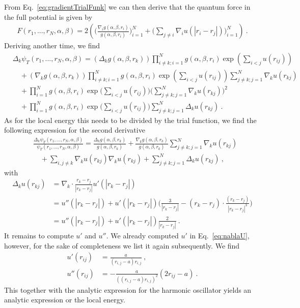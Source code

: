 \documentclass[11pt,a4paper]{article}
\numberwithin{equation}{section}
\begin{document}
From Eq.~\eqref{eq:gradientTrialFunk} we can then derive that the quantum force in the full potential is given by
\begin{align*}
F(r_1,...,r_N,\alpha,\beta)
=
2\left(
\Bigg(\frac{\nabla_i g(\alpha,\beta,{r}_i)}{g(\alpha,\beta,{r}_i)}\Bigg)_{i=1}^N
+
\Bigg(\sum_{j\neq i}\nabla_i u(|r_i-r_j|) \Bigg)_{i=1}^N
\right)~.
\end{align*}
Deriving another time, we find
\begin{equation}
\label{eq:LaplaceTrialFunk}
\begin{aligned}
&\Delta_k\psi_T(r_1,...,r_N,\alpha,\beta)
=
\left(\Delta_kg(\alpha,\beta,{r}_k)\right)\prod_{i\neq k;i=1}^N g(\alpha,\beta,{r}_i)\exp{\left(\sum_{i<j}u(r_{ij})\right)}\\
&\quad +
\left(\nabla_kg(\alpha,\beta,{r}_k)\right)\prod_{i\neq k;i=1}^N g(\alpha,\beta,{r}_i)\exp\left(\sum_{i<j}u(r_{ij})\right)\sum_{j\neq k;j=1}^N\nabla_k u(r_{kj})\\
&\quad +
\prod_{i=1}^N g(\alpha,\beta,{r}_i)\exp{\Bigg(\sum_{i<j}u(r_{ij})\Bigg)}\Bigg(\sum_{j\neq k;j=1}^N\nabla_k u(r_{kj})\Bigg)^2\\
&\quad +
\prod_{i=1}^N g(\alpha,\beta,{r}_i)\exp{\Bigg(\sum_{i<j}u(r_{ij})\Bigg)}\sum_{j\neq k;j=1}^N\Delta_k u(r_{kj})~.
\end{aligned}
\end{equation}
As for the local energy this needs to be divided by the trial function, we find the following expression for the second derivative
\begin{equation}
\label{eq:LaplaceTrialFunkQuot}
\begin{aligned}
&\frac{\Delta_k\psi_T(r_1,...,r_N,\alpha,\beta)}{\psi_T(r_1,...,r_N,\alpha,\beta)}
=
\frac{\Delta_kg(\alpha,\beta,{r}_k)}{g(\alpha,\beta,{r}_k)}
+
\frac{\nabla_kg(\alpha,\beta,{r}_k)}{g(\alpha,\beta,{r}_k)}\sum_{j\neq k;j=1}^N\nabla_k u(r_{kj})\\
&\quad +
\sum_{i,j\neq k}\nabla_k u(r_{kj})\nabla_k u(r_{kj})
+
\sum_{j\neq k;j=1}^N\Delta_k u(r_{kj})~,
\end{aligned}
\end{equation}
with 
\begin{align*}
\Delta_ku(r_{kj})
&=
\nabla_k\cdot \frac{r_k-r_j}{|r_k-r_j|}u'(|r_k-r_j|)\\
&=
u''(|r_k-r_j|)
+
u'(|r_k-r_j|)\Bigg(
\frac{3}{|r_k-r_j|}
-(r_k-r_j)\cdot\frac{(r_k-r_j)}{|r_k-r_j|^3}
\Bigg)\\
&=
u''(|r_k-r_j|)
+
u'(|r_k-r_j|)
\frac{2}{|r_k-r_j|}~.
\end{align*}
It remains to compute $u'$ and $u''$.
%
We already computed $u'$ in Eq.~\eqref{eq:nablaU}, however, for the sake of completeness we list it again subsequently.
%
We find
\begin{align*}
u'(r_{ij})&=\frac{a}{(r_{i,j}-a)r_{i,j}}~,\\
u''(r_{ij})&=-\frac{a}{((r_{i,j}-a)r_{i,j})^2}(2r_{ij}-a)~.
\end{align*} 
This together with the analytic expression for the harmonic oscillator yields an analytic expression or the local energy.
\end{document}
